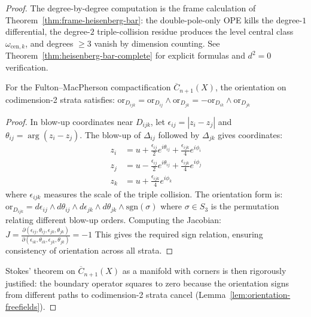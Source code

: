 \begin{proof}
The degree-by-degree computation is the frame calculation of
Theorem~\ref{thm:frame-heisenberg-bar}:
the double-pole-only OPE kills the degree-$1$ differential,
the degree-$2$ triple-collision residue produces the level central
class $\omega_{\mathrm{cen},k}$, and degrees $\geq 3$ vanish by
dimension counting.
See Theorem~\ref{thm:heisenberg-bar-complete} for explicit formulas
and $d^2 = 0$ verification.

\begin{lemma}\label{lem:orientation-freefields}
For the Fulton--MacPherson compactification $\overline{C}_{n+1}(X)$, the orientation on codimension-2 strata satisfies:
$\text{or}_{D_{ijk}} = \text{or}_{D_{ij}} \wedge \text{or}_{D_{jk}} = -\text{or}_{D_{ik}} \wedge \text{or}_{D_{jk}}$
\end{lemma}

\begin{proof}
In blow-up coordinates near $D_{ijk}$, let $\epsilon_{ij} = |z_i - z_j|$ and $\theta_{ij} = \arg(z_i - z_j)$. The blow-up of $\Delta_{ij}$ followed by $\Delta_{jk}$ gives coordinates:
\begin{align}
z_i &= u + \frac{\epsilon_{ij}}{2}e^{i\theta_{ij}} + \frac{\epsilon_{ijk}}{4}e^{i\phi_i}\\
z_j &= u - \frac{\epsilon_{ij}}{2}e^{i\theta_{ij}} + \frac{\epsilon_{ijk}}{4}e^{i\phi_j}\\
z_k &= u + \frac{\epsilon_{ijk}}{4}e^{i\phi_k}
\end{align}
where $\epsilon_{ijk}$ measures the scale of the triple collision. The orientation form is:
$\text{or}_{D_{ijk}} = d\epsilon_{ij} \wedge d\theta_{ij} \wedge d\epsilon_{jk} \wedge d\theta_{jk} \wedge \text{sgn}(\sigma)$
where $\sigma \in S_3$ is the permutation relating different blow-up orders. Computing the Jacobian:
$J = \frac{\partial(\epsilon_{ij}, \theta_{ij}, \epsilon_{jk}, \theta_{jk})}{\partial(\epsilon_{ik}, \theta_{ik}, \epsilon_{jk}, \theta_{jk})} = -1$
This gives the required sign relation, ensuring consistency of orientation across all strata.
\end{proof}

Stokes' theorem on $\overline{C}_{n+1}(X)$ as a manifold with corners is then rigorously justified: the boundary operator squares to zero because the orientation signs from different paths to codimension-2 strata cancel (Lemma~\ref{lem:orientation-freefields}).
\end{proof}


